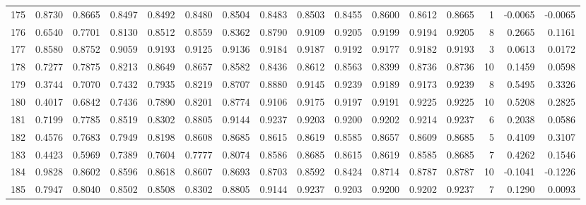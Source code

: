 \begin{tabular}{lrrrrrrrrrrrrrrr}
175 &      0.8730 &  0.8665 &  0.8497 &  0.8492 &  0.8480 &  0.8504 &  0.8483 &  0.8503 &  0.8455 &  0.8600 &   0.8612 &     0.8665 &      1 &                   -0.0065 &                    -0.0065 \\
176 &      0.6540 &  0.7701 &  0.8130 &  0.8512 &  0.8559 &  0.8362 &  0.8790 &  0.9109 &  0.9205 &  0.9199 &   0.9194 &     0.9205 &      8 &                    0.2665 &                     0.1161 \\
177 &      0.8580 &  0.8752 &  0.9059 &  0.9193 &  0.9125 &  0.9136 &  0.9184 &  0.9187 &  0.9192 &  0.9177 &   0.9182 &     0.9193 &      3 &                    0.0613 &                     0.0172 \\
178 &      0.7277 &  0.7875 &  0.8213 &  0.8649 &  0.8657 &  0.8582 &  0.8436 &  0.8612 &  0.8563 &  0.8399 &   0.8736 &     0.8736 &     10 &                    0.1459 &                     0.0598 \\
179 &      0.3744 &  0.7070 &  0.7432 &  0.7935 &  0.8219 &  0.8707 &  0.8880 &  0.9145 &  0.9239 &  0.9189 &   0.9173 &     0.9239 &      8 &                    0.5495 &                     0.3326 \\
180 &      0.4017 &  0.6842 &  0.7436 &  0.7890 &  0.8201 &  0.8774 &  0.9106 &  0.9175 &  0.9197 &  0.9191 &   0.9225 &     0.9225 &     10 &                    0.5208 &                     0.2825 \\
181 &      0.7199 &  0.7785 &  0.8519 &  0.8302 &  0.8805 &  0.9144 &  0.9237 &  0.9203 &  0.9200 &  0.9202 &   0.9214 &     0.9237 &      6 &                    0.2038 &                     0.0586 \\
182 &      0.4576 &  0.7683 &  0.7949 &  0.8198 &  0.8608 &  0.8685 &  0.8615 &  0.8619 &  0.8585 &  0.8657 &   0.8609 &     0.8685 &      5 &                    0.4109 &                     0.3107 \\
183 &      0.4423 &  0.5969 &  0.7389 &  0.7604 &  0.7777 &  0.8074 &  0.8586 &  0.8685 &  0.8615 &  0.8619 &   0.8585 &     0.8685 &      7 &                    0.4262 &                     0.1546 \\
184 &      0.9828 &  0.8602 &  0.8596 &  0.8618 &  0.8607 &  0.8693 &  0.8703 &  0.8592 &  0.8424 &  0.8714 &   0.8787 &     0.8787 &     10 &                   -0.1041 &                    -0.1226 \\
185 &      0.7947 &  0.8040 &  0.8502 &  0.8508 &  0.8302 &  0.8805 &  0.9144 &  0.9237 &  0.9203 &  0.9200 &   0.9202 &     0.9237 &      7 &                    0.1290 &                     0.0093 \\

\end{tabular}
